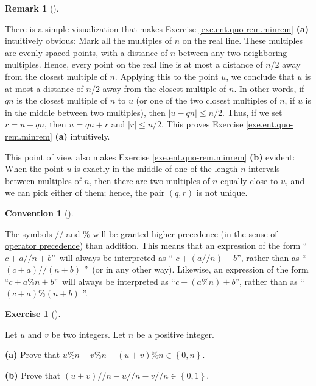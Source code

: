 \documentclass[numbers=enddot,12pt,final,onecolumn,notitlepage]{scrartcl}%
\newcounter{exer}
\numberwithin{exer}{subsection}
\theoremstyle{definition}
\newtheorem{remk}[theo]{Remark}
\newenvironment{remark}[1][]
{\begin{remk}[#1]\begin{leftbar}}
{\end{leftbar}\end{remk}}
\newtheorem{conv}[theo]{Convention}
\newenvironment{convention}[1][]
{\begin{conv}[#1]\begin{leftbar}}
{\end{leftbar}\end{conv}}
\newtheorem{exmp}[exer]{Exercise}
\newenvironment{exercise}[1][]
{\begin{exmp}[#1]\begin{leftbar}}
{\end{leftbar}\end{exmp}}
\begin{document}
\begin{remark}
\label{rmk.ent.quo-rem.minrem.geo}There is a simple visualization that makes
Exercise \ref{exe.ent.quo-rem.minrem} \textbf{(a)} intuitively obvious: Mark
all the multiples of $n$ on the real line. These multiples are evenly spaced
points, with a distance of $n$ between any two neighboring multiples. Hence,
every point on the real line is at most a distance of $n/2$ away from the
closest multiple of $n$. Applying this to the point $u$, we conclude that $u$
is at most a distance of $n/2$ away from the closest multiple of $n$. In other
words, if $qn$ is the closest multiple of $n$ to $u$ (or one of the two
closest multiples of $n$, if $u$ is in the middle between two multiples), then
$\left\vert u-qn\right\vert \leq n/2$. Thus, if we set $r=u-qn$, then $u=qn+r$
and $\left\vert r\right\vert \leq n/2$. This proves Exercise
\ref{exe.ent.quo-rem.minrem} \textbf{(a)} intuitively.

This point of view also makes Exercise \ref{exe.ent.quo-rem.minrem}
\textbf{(b)} evident: When the point $u$ is exactly in the middle of one of
the length-$n$ intervals between multiples of $n$, then there are two
multiples of $n$ equally close to $u$, and we can pick either of them; hence,
the pair $\left(  q,r\right)  $ is not unique.
\end{remark}

\begin{convention}
\label{conv.ent.quo-rem.prec}The symbols $//$ and $\%$ will be granted higher
precedence (in the sense of
\href{https://en.wikipedia.org/wiki/Order_of_operations}{operator precedence})
than addition. This means that an expression of the form \textquotedblleft%
$c+a//n+b$\textquotedblright\ will always be interpreted as \textquotedblleft%
$c+\left(  a//n\right)  +b$\textquotedblright, rather than as
\textquotedblleft$\left(  c+a\right)  //\left(  n+b\right)  $%
\textquotedblright\ (or in any other way). Likewise, an expression of the form
\textquotedblleft$c+a\%n+b$\textquotedblright\ will always be interpreted as
\textquotedblleft$c+\left(  a\%n\right)  +b$\textquotedblright, rather than as
\textquotedblleft$\left(  c+a\right)  \%\left(  n+b\right)  $%
\textquotedblright.
\end{convention}

\begin{exercise}
\label{exe.ent.quo-rem.u+v}Let $u$ and $v$ be two integers. Let $n$ be a
positive integer.

\textbf{(a)} Prove that $u\%n+v\%n-\left(  u+v\right)  \%n\in\left\{
0,n\right\}  $.

\textbf{(b)} Prove that $\left(  u+v\right)  //n-u//n-v//n\in\left\{
0,1\right\}  $.
\end{exercise}
\end{document}
